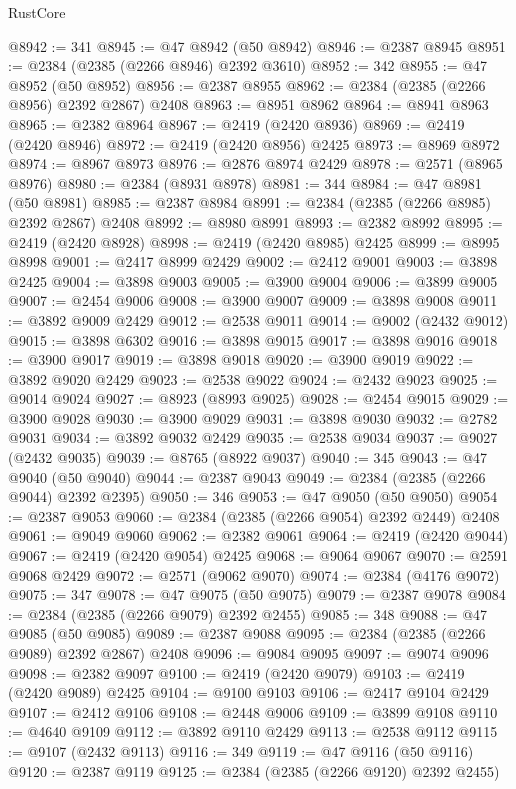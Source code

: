 \begin{lexlean}{RustCore}
\begin{coremodule}
@8942 := 341
@8945 := @47 @8942 (@50 @8942)
@8946 := @2387 @8945
@8951 := @2384 (@2385 (@2266 @8946) @2392 @3610)
@8952 := 342
@8955 := @47 @8952 (@50 @8952)
@8956 := @2387 @8955
@8962 := @2384 (@2385 (@2266 @8956) @2392 @2867) @2408
@8963 := @8951 @8962
@8964 := @8941 @8963
@8965 := @2382 @8964
@8967 := @2419 (@2420 @8936)
@8969 := @2419 (@2420 @8946)
@8972 := @2419 (@2420 @8956) @2425
@8973 := @8969 @8972
@8974 := @8967 @8973
@8976 := @2876 @8974 @2429
@8978 := @2571 (@8965 @8976)
@8980 := @2384 (@8931 @8978)
@8981 := 344
@8984 := @47 @8981 (@50 @8981)
@8985 := @2387 @8984
@8991 := @2384 (@2385 (@2266 @8985) @2392 @2867) @2408
@8992 := @8980 @8991
@8993 := @2382 @8992
@8995 := @2419 (@2420 @8928)
@8998 := @2419 (@2420 @8985) @2425
@8999 := @8995 @8998
@9001 := @2417 @8999 @2429
@9002 := @2412 @9001
@9003 := @3898 @2425
@9004 := @3898 @9003
@9005 := @3900 @9004
@9006 := @3899 @9005
@9007 := @2454 @9006
@9008 := @3900 @9007
@9009 := @3898 @9008
@9011 := @3892 @9009 @2429
@9012 := @2538 @9011
@9014 := @9002 (@2432 @9012)
@9015 := @3898 @6302
@9016 := @3898 @9015
@9017 := @3898 @9016
@9018 := @3900 @9017
@9019 := @3898 @9018
@9020 := @3900 @9019
@9022 := @3892 @9020 @2429
@9023 := @2538 @9022
@9024 := @2432 @9023
@9025 := @9014 @9024
@9027 := @8923 (@8993 @9025)
@9028 := @2454 @9015
@9029 := @3900 @9028
@9030 := @3900 @9029
@9031 := @3898 @9030
@9032 := @2782 @9031
@9034 := @3892 @9032 @2429
@9035 := @2538 @9034
@9037 := @9027 (@2432 @9035)
@9039 := @8765 (@8922 @9037)
@9040 := 345
@9043 := @47 @9040 (@50 @9040)
@9044 := @2387 @9043
@9049 := @2384 (@2385 (@2266 @9044) @2392 @2395)
@9050 := 346
@9053 := @47 @9050 (@50 @9050)
@9054 := @2387 @9053
@9060 := @2384 (@2385 (@2266 @9054) @2392 @2449) @2408
@9061 := @9049 @9060
@9062 := @2382 @9061
@9064 := @2419 (@2420 @9044)
@9067 := @2419 (@2420 @9054) @2425
@9068 := @9064 @9067
@9070 := @2591 @9068 @2429
@9072 := @2571 (@9062 @9070)
@9074 := @2384 (@4176 @9072)
@9075 := 347
@9078 := @47 @9075 (@50 @9075)
@9079 := @2387 @9078
@9084 := @2384 (@2385 (@2266 @9079) @2392 @2455)
@9085 := 348
@9088 := @47 @9085 (@50 @9085)
@9089 := @2387 @9088
@9095 := @2384 (@2385 (@2266 @9089) @2392 @2867) @2408
@9096 := @9084 @9095
@9097 := @9074 @9096
@9098 := @2382 @9097
@9100 := @2419 (@2420 @9079)
@9103 := @2419 (@2420 @9089) @2425
@9104 := @9100 @9103
@9106 := @2417 @9104 @2429
@9107 := @2412 @9106
@9108 := @2448 @9006
@9109 := @3899 @9108
@9110 := @4640 @9109
@9112 := @3892 @9110 @2429
@9113 := @2538 @9112
@9115 := @9107 (@2432 @9113)
@9116 := 349
@9119 := @47 @9116 (@50 @9116)
@9120 := @2387 @9119
@9125 := @2384 (@2385 (@2266 @9120) @2392 @2455)

\end{coremodule}
\end{lexlean}
